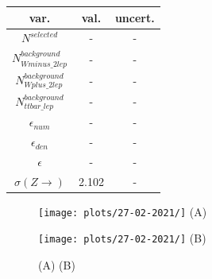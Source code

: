 \begin{tabular}{ | c | c | c |}
  \hline			
  var. & val. & uncert. \\
  \hline 
  
  $N^{selected}$ & - & - \\
  
  $N^{background}_{Wminus\_2lep}$ & - & - \\
  
  $N^{background}_{Wplus\_2lep}$ & - & - \\
  
  $N^{background}_{ttbar\_lep}$ & - & - \\
  
  $\epsilon_{num}$ & - & - \\
  
  $\epsilon_{den}$ & - & - \\
  \hline  
  $\epsilon$ &  - & - \\
  $\sigma(Z \rightarrow )$ & 2.102 & - \\
  \hline  
\end{tabular}

\begin{figure}[h!]
    \centering
    \begin{minipage}{0.5\textwidth}
        \centering
        \texttt{[image: plots/27-02-2021/]}
        (A)
    \end{minipage}\hfill
    \begin{minipage}{0.5\textwidth}
        \centering
        \texttt{[image: plots/27-02-2021/]}
        (B)
    \end{minipage}
    \caption{(A)  (B)}
    \label{}
\end{figure}

